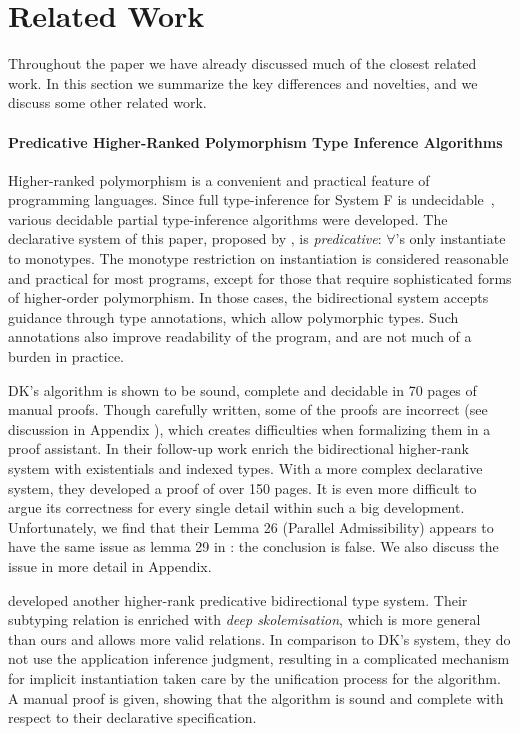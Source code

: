\section{Related Work}

Throughout the paper we have already discussed much of the closest related work.
In this section we summarize the key differences and novelties, and we discuss some other
related work.

\paragraph{Predicative Higher-Ranked Polymorphism Type Inference Algorithms}
Higher-ranked polymorphism is a convenient and practical feature of
programming languages.  Since full type-inference for System F is
undecidable~\cite{wells1999typability}, various decidable partial
type-inference algorithms were developed.
The declarative system of this paper,
proposed by \citet{dunfield2013complete}, is \emph{predicative}: 
$\forall$'s only instantiate to monotypes.  The monotype restriction
on instantiation is considered reasonable and practical for most
programs, except for those that require sophisticated forms of
higher-order polymorphism.  In those cases, the bidirectional system
accepts guidance through type annotations, which allow polymorphic types.
Such annotations also improve
readability of the program, and are not much of a burden in practice.

DK's algorithm is shown to be sound, complete and decidable in 70 pages of manual proofs.
Though carefully written, some of the proofs are incorrect
(see discussion in Appendix
),
which creates difficulties when formalizing them in a proof assistant.
In their follow-up work \citet{DunfieldIndexed} enrich the bidirectional higher-rank system with
existentials and indexed types.
With a more complex declarative system, they developed a proof of over 150 pages.
It is even more difficult to argue its correctness for every single detail within such a big development.
Unfortunately, we find that their Lemma 26 (Parallel Admissibility) appears to have the same issue 
as lemma 29 in \citet{dunfield2013complete}: the conclusion is false. We also discuss
the issue in more detail in Appendix. %

\citet{jones2007practical} developed another higher-rank predicative bidirectional type system.
Their subtyping relation is enriched with \emph{deep skolemisation},
which is more general than ours and allows more valid relations.
In comparison to DK's system, they do not use the application inference judgment,
resulting in a complicated mechanism for implicit instantiation taken care by the unification process for the algorithm.
A manual proof is given, showing that the algorithm is sound and
complete with respect to their declarative specification.

